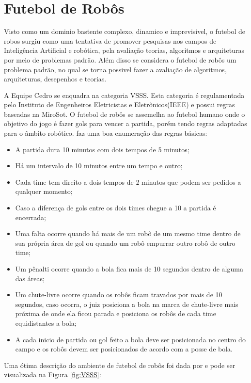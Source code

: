\section{Futebol de Robôs}
 Visto como um dominio bastente complexo, dinamico e imprevisivel\cite{Faria2006,Costa:2000}, o futebol de robos surgiu como uma tentativa de promover pesquisas nos campos de Inteligência Artificial e robótica, pela avaliação teorias, algoritmos e arquiteturas por meio de problemas padrão\cite{Kitano:1997}. Além disso se considera o futebol de robôs um problema padrão, no qual se torna possivel fazer a avaliação de algoritmos, arquiteturas, desepenhos e teorias\cite{Faria2006}.

 A Equipe Cedro se enquadra na categoria VSSS. Esta categoria é regulamentada pelo Instituto de Engenheiros Eletricistas e Eletrônicos(IEEE) e possui regras baseadas na MiroSot\cite{Rosa:2015}. O futebol de robôs se assemelha ao futebol humano onde o objetivo do jogo é fazer gols para vencer a partida, porém tendo regras adaptadas para o âmbito robótico. 
 faz uma boa enumeração das regras básicas:
 \begin{itemize}
 \item A partida dura 10 minutos com dois tempos de 5 minutos;
  \item Há um intervalo de 10 minutos entre um tempo e outro;
   \item Cada time tem direito a dois tempos de 2 minutos que podem ser pedidos a qualquer
   momento;
    \item Caso a diferença de gols entre os dois times chegue a 10 a partida é encerrada;
     \item Uma falta ocorre quando há mais de um robô de um mesmo time dentro de sua própria
     área de gol ou quando um robô empurrar outro robô de outro time;
     \item Um pênalti ocorre quando a bola fica mais de 10 segundos dentro de alguma das áreas;
     \item Um chute-livre ocorre quando os robôs ficam travados por mais de 10 segundos, caso
     ocorra, o juiz posiciona a bola na marca de chute-livre mais próxima de onde ela ficou
     parada e posiciona os robôs de cada time equidistantes a bola;
     \item A cada inicio de partida ou gol feito a bola deve ser posicionada no centro do campo e os
     robôs devem ser posicionados de acordo com a posse de bola.
 \end{itemize}
Uma ótima descrição do ambiente de futebol de robôs foi dada por  e pode ser visualizada na Figura \ref{fig:VSSS}:
